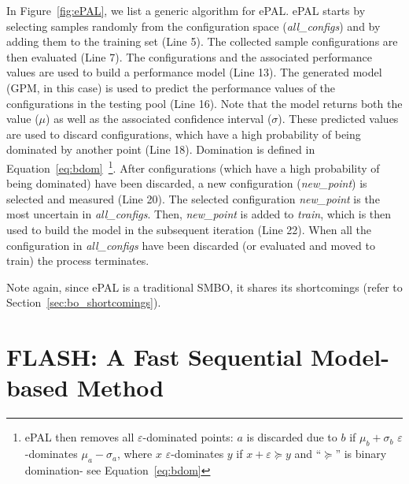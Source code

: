 In Figure~\ref{fig:ePAL}, we list a generic algorithm for ePAL. ePAL starts by selecting samples randomly from the configuration space (\textit{all\_configs}) and by adding them to the training set (Line 5). The collected sample configurations are then evaluated (Line 7). The configurations and the associated performance values are used to build a performance model (Line 13). The generated model (GPM, in this case) is used to predict the performance values of the configurations in the testing pool (Line 16). Note that the model returns both the value ($\mu$) as well as the associated confidence interval ($\sigma$). These predicted values are used to discard configurations, which have a high probability of being dominated by another point (Line 18). Domination is defined in Equation~\ref{eq:bdom}~\footnote{ePAL then removes all  $\varepsilon$-dominated points:
$a$ is discarded due to $b$ if $\mu_b + \sigma_b$  $\varepsilon$-dominates $\mu_a - \sigma_a$, where  
$x$  $\varepsilon$-dominates $y$ if $x + \varepsilon \succeq  y$
and  ``$\succeq$'' is   binary domination- see Equation~\ref{eq:bdom}}. After configurations (which have a high probability of being dominated) have been discarded, a new configuration (\textit{new\_point}) is selected and measured (Line 20). The selected configuration \textit{new\_point} is the most uncertain in \textit{all\_configs}. Then, \textit{new\_point} is added to \textit{train}, which is then used to build the model in the subsequent iteration (Line 22). When all the configuration in \textit{all\_configs} have been discarded (or evaluated and moved to train) the process terminates.

Note again, since ePAL is a traditional SMBO, it shares its shortcomings (refer to Section~\ref{sec:bo_shortcomings}).



\section{{\bfseries FLASH}: A Fast Sequential Model-based Method}
 

